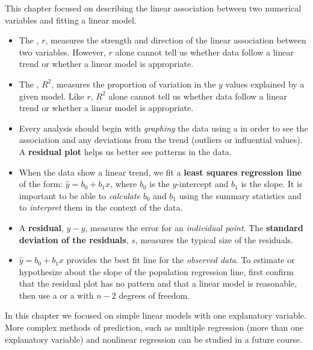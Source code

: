 {}


\reviewchapterheader{}

\noindent This chapter focused on describing the linear association between two numerical variables and fitting a linear model.  
\begin{itemize}
\item The , $r$, measures the strength and direction of the linear association between two variables.  However, $r$ alone cannot tell us whether data follow a linear trend or whether a linear model is appropriate.

\item The , $R^2$, measures the proportion of variation in the $y$ values explained by a given model.  Like $r$, $R^2$ alone cannot tell us whether data follow a linear trend or whether a linear model is appropriate.  

\item Every analysis should begin with \emph{graphing} the data using a  in order to see the association and any deviations from the trend (outliers or influential values).  A \textbf{residual plot} helps us better see patterns in the data.  

\item When the data show a linear trend, we fit a \textbf{least squares regression line} of the form: $\hat{y} = b_0+b_1x$, where $b_0$ is the $y$-intercept and $b_1$ is the slope.  It is important to be able to \emph{calculate} $b_0$ and $b_1$ using the summary statistics and to \emph{interpret} them in the context of the data.

\item A \textbf{residual}, $y-\hat{y}$, measures the error for an \emph{individual point}.  The \textbf{standard deviation of the residuals}, $s$, measures the typical size of the residuals.  

\item $\hat{y} = b_0+b_1x$ provides the best fit line for the \emph{observed data}.  To estimate or hypothesize about the slope of the population regression line, first confirm that the residual plot has no pattern and that a linear model is reasonable, then use a  or a  with $n-2$ degrees of freedom.
\end{itemize}
In this chapter we focused on simple linear models with one explanatory variable.  More complex methods of prediction, such as multiple regression (more than one explanatory variable) and nonlinear regression can be studied in a future course.


